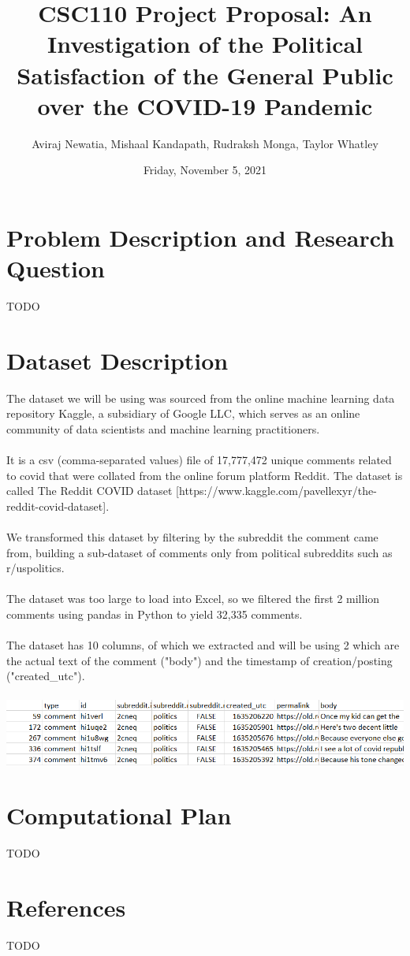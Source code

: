\documentclass[fontsize=11pt]{article}
\title{CSC110 Project Proposal: An Investigation of the Political Satisfaction of the General Public over the COVID-19 Pandemic}
\author{Aviraj Newatia, Mishaal Kandapath, Rudraksh Monga, Taylor Whatley}
\date{Friday, November 5, 2021}
\begin{document}
\maketitle

\section*{Problem Description and Research Question}

TODO

\section*{Dataset Description}

The dataset we will be using was sourced from the online machine learning data repository Kaggle, a subsidiary of Google LLC, which serves as an online community of data scientists and machine learning practitioners. 
\\\\
It is a csv (comma-separated values) file of 17,777,472 unique comments related to covid that were collated from the online forum platform Reddit. The dataset is called The Reddit COVID dataset [https://www.kaggle.com/pavellexyr/the-reddit-covid-dataset].
\\\\
We transformed this dataset by filtering by the subreddit the comment came from, building a sub-dataset of comments only from political subreddits such as r/uspolitics. 
\\\\
The dataset was too large to load into Excel, so we filtered the first 2 million comments using pandas in Python to yield 32,335 comments. 
\\\\
The dataset has 10 columns, of which we extracted and will be using 2 which are the actual text of the comment ("body") and the timestamp of creation/posting ("created\_utc"). \\\\
\includegraphics{rows.png}

\section*{Computational Plan}

TODO

\section*{References}

TODO

\end{document}
